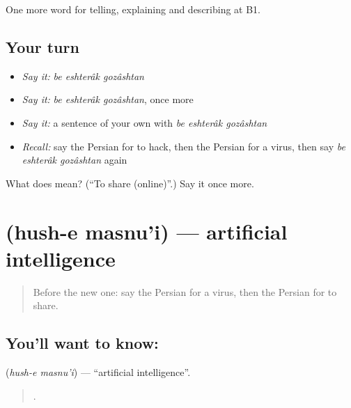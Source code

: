 \begin{grammarlens}[title={What you've built}]
One more word for telling, explaining and describing at B1.
\end{grammarlens}

\subsection*{Your turn}
\begin{itemize}
\raggedright
  \item \emph{Say it:} \emph{be eshterâk gozâshtan}
  \item \emph{Say it:} \emph{be eshterâk gozâshtan}, once more
  \item \emph{Say it:} a sentence of your own with \emph{be eshterâk gozâshtan}
  \item \emph{Recall:} say the Persian for to hack, then the Persian for a virus, then say \emph{be eshterâk gozâshtan} again
\end{itemize}

\begin{tcolorbox}[breakable,colback=teal!4,colframe=teal!35!black,title={Before you move on}]
What does    mean? (\textquotedblleft{}To share (online)\textquotedblright{}.) Say it once more.
\end{tcolorbox}
\section[\texorpdfstring{\fa{هوش} \fa{مصنوعی} (hush-e masnu'i)}{هوش مصنوعی (hush-e masnu'i)}]{  (hush-e masnu'i) — artificial intelligence}

\label{lesson:FA-C419-hush-e-masnui}



\begin{quote}
Before the new one: say the Persian for a virus, then the Persian for to share.
\end{quote}

\subsection*{You'll want to know:  }
\textbf{ } (\emph{hush-e masnu'i}) — \textquotedblleft{}artificial intelligence\textquotedblright{}.

\begin{quote}
        .
\end{quote}

